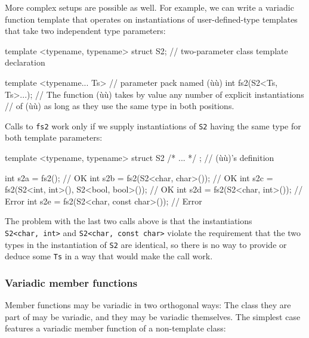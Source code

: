 \noindent More complex setups are possible as well. For example, we can write a
variadic function template that operates on instantiations of
user-defined-type templates that take two independent type parameters:

\begin{emcppslisting}
template <typename, typename>
struct S2;                  // two-parameter class template declaration

template <typename... Ts>   // parameter pack named (ù{}ù)
int fs2(S2<Ts, Ts>...);
    // The function (ù{}ù) takes by value any number of explicit instantiations
    // of (ù{}ù) as long as they use the same type in both positions.
\end{emcppslisting}
    

\noindent Calls to \lstinline!fs2! work only if we supply instantiations of
\lstinline!S2! having the same type for both template parameters:

\begin{emcppslisting}
template <typename, typename> struct S2 { /* ... */ };  // (ù{}ù)'s definition

int s2a = fs2();                                      // OK
int s2b = fs2(S2<char, char>());                      // OK
int s2c = fs2(S2<int, int>(), S2<bool, bool>());      // OK
int s2d = fs2(S2<char, int>());                       // Error
int s2e = fs2(S2<char, const char>());                // Error
\end{emcppslisting}
    

\noindent The problem with the last two calls above is that the instantiations
\lstinline!S2<char,!~\lstinline!int>! and
\lstinline!S2<char,!~\lstinline!const!~\lstinline!char>! violate the requirement
that the two types in the instantiation of \lstinline!S2! are identical, so
there is no way to provide or deduce some \lstinline!Ts! in a way that
would make the call work.

\subsubsection[Variadic member functions]{Variadic member functions}\label{variadic-member-functions}

Member functions may be variadic in two orthogonal ways: The class they
are part of may be variadic, and they may be variadic themselves. The
simplest case features a variadic member function of a non-template
class:

